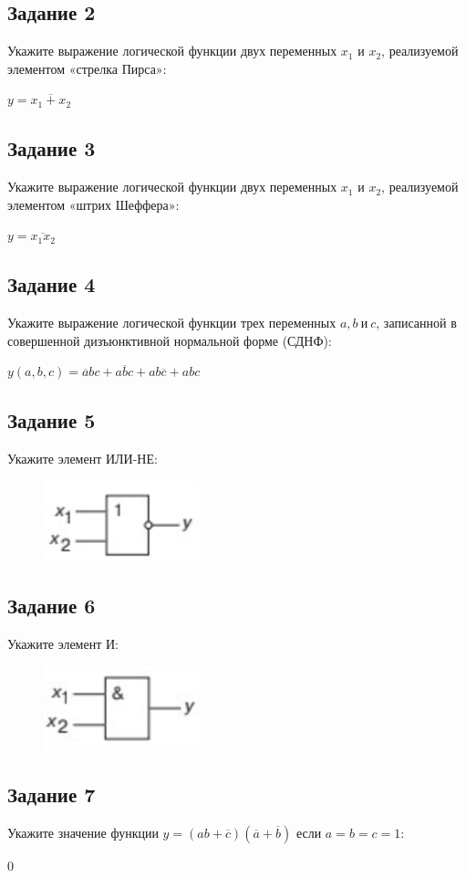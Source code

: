 \documentclass[bachelor, och, labwork]{shiza}
\begin{document}
\subsection{Задание 2}
    Укажите выражение логической функции двух переменных $x_1$ и $x_2$, реализуемой элементом «стрелка Пирса»:
    
    \begin{center}$y = \overline{x_1 + x_2}$\end{center}

\subsection{Задание 3}
     Укажите выражение логической функции двух переменных $x_1$ и $x_2$, реализуемой элементом «штрих Шеффера»:
    
    \begin{center}$y = \overline{x_1x_2}$\end{center}
    
\subsection{Задание 4}
     Укажите выражение логической функции трех переменных $a, b ~\text{и}~ c$, 
     записанной в совершенной дизъюнктивной нормальной форме (СДНФ):

    \begin{center}$y(a, b, c) = \overline{a}bc + a\overline{b}c + ab\overline{c} + abc$\end{center}

\subsection{Задание 5}
    Укажите элемент ИЛИ-НЕ:
    
    \begin{figure}[H]
        \centering    
        \includegraphics[width=0.4\textwidth]{pic1/3.png}
    \end{figure}

   
\subsection{Задание 6}
    Укажите элемент И:
    
    \begin{figure}[H]
        \centering
        \includegraphics[width=0.4\textwidth]{pic1/4.png}
    \end{figure}

\subsection{Задание 7}
    Укажите значение функции $y = (ab + \overline{c})(\overline{a} + \overline{b})$ если $a = b = c = 1$:
    
    0
\end{document}
